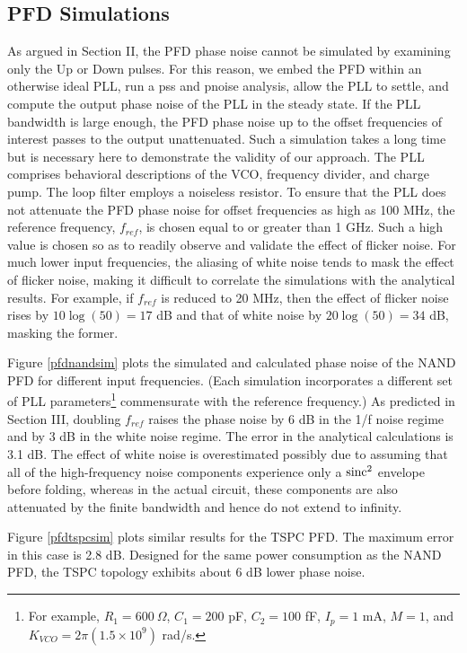 \subsection{PFD Simulations}
As argued in Section II, the PFD phase noise cannot be simulated by examining only the Up or Down pulses. For this reason, we embed the
PFD within an otherwise ideal PLL, run a pss and pnoise analysis, allow the PLL to settle, and compute the output phase noise
of the PLL in the steady state. If the PLL bandwidth is large enough, the PFD phase noise up to the offset frequencies of interest passes to
the output unattenuated. Such a simulation takes a long time but is necessary here to demonstrate the validity of our approach.
The PLL comprises behavioral descriptions of the VCO, frequency divider, and charge pump. The loop filter employs a noiseless resistor. To ensure
that the PLL does not attenuate the PFD phase noise for offset frequencies as high as 100 MHz, the reference frequency, $f_{ref}$, is chosen equal to or
greater than 1 GHz. 
{Such a high value is chosen so as to readily observe and validate the effect of flicker noise. 
For much lower input frequencies, the aliasing of white noise tends to mask the effect of flicker noise, making it difficult to correlate the
simulations with the analytical results. For example, if $f_{ref}$ is reduced to 20 MHz, then the effect of flicker noise rises by $10\log(50)=17$
dB and that of white noise by $20\log(50)=34$ dB, masking the former.} 




Figure \ref{pfdnandsim} plots the simulated and calculated phase noise of the NAND PFD for different input frequencies. (Each simulation
incorporates a different set of PLL parameters\footnote{For example, $R_1=600~\Omega$, $C_1=200$ pF, $C_2=100$ fF, $I_p=1$ mA,
$M=1$,
and $K_{VCO}=2\pi(1.5\times 10^9)$ rad/s.} commensurate with the reference frequency.) As predicted in Section III, doubling $f_{ref}$ raises
the phase noise by 6 dB in the 1/f noise regime and by 3 dB in the white noise regime. The error in the analytical calculations is 3.1 dB. 
{The effect of white noise is overestimated possibly due to assuming that all of the high-frequency noise components experience only a
$\rm sinc^2$ envelope before folding, whereas in the actual circuit, these components are also attenuated by the finite bandwidth and hence do not
extend to infinity.
}

Figure \ref{pfdtspcsim} plots similar results for the TSPC PFD. The maximum error in this case is 2.8 dB. Designed for the same power
consumption as the NAND PFD, the TSPC topology exhibits about 6 dB lower phase noise.

